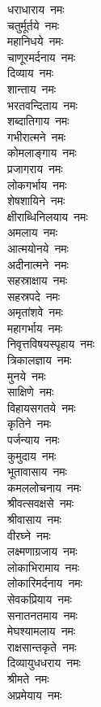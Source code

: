 \begin{multicols}{2}
\begin{flushleft}
धराधाराय~नमः\\
चतुर्मूर्तये~नमः\\
महानिधये~नमः\\
चाणूरमर्दनाय~नमः\hfill{}\\
दिव्याय~नमः\\
शान्ताय~नमः\\
भरतवन्दिताय~नमः\\
शब्दातिगाय~नमः\\
गभीरात्मने~नमः\\
कोमलाङ्गाय~नमः\\
प्रजागराय~नमः\\
लोकगर्भाय~नमः\\
शेषशायिने~नमः\\
क्षीराब्धिनिलयाय~नमः\hfill{}\\
अमलाय~नमः\\
आत्मयोनये~नमः\\
अदीनात्मने~नमः\\
सहस्राक्षाय~नमः\\
सहस्रपदे~नमः\\
अमृतांशवे~नमः\\
महागर्भाय~नमः\\
निवृत्तविषयस्पृहाय~नमः\\
त्रिकालज्ञाय~नमः\\
मुनये~नमः\hfill{}\\
साक्षिणे~नमः\\
विहायसगतये~नमः\\
कृतिने~नमः\\
पर्जन्याय~नमः\\
कुमुदाय~नमः\\
भूतावासाय~नमः\\
कमललोचनाय~नमः\\
श्रीवत्सवक्षसे~नमः\\
श्रीवासाय~नमः\\
वीरघ्ने~नमः\hfill{}\\
लक्ष्मणाग्रजाय~नमः\\
लोकाभिरामाय~नमः\\
लोकारिमर्दनाय~नमः\\
सेवकप्रियाय~नमः\\
सनातनतमाय~नमः\\
मेघश्यामलाय~नमः\\
राक्षसान्तकृते~नमः\\
दिव्यायुधधराय~नमः\\
श्रीमते~नमः\\
अप्रमेयाय~नमः\hfill{}\\

\end{flushleft}
\end{multicols}
